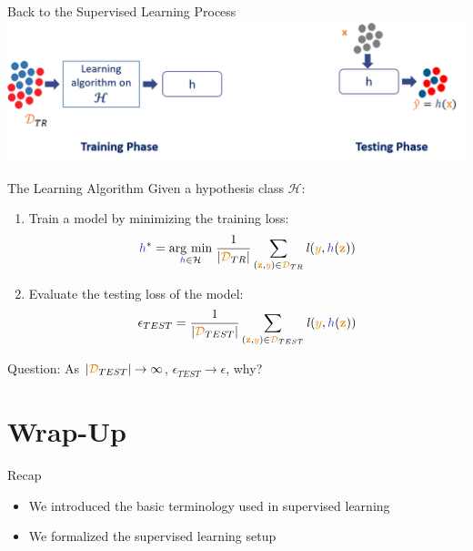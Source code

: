 \documentclass[aspectratio=169,10pt]{beamer}
\begin{document}
\begin{frame}{Back to the Supervised Learning Process}
	\centering
	\includegraphics[width=\textwidth, clip]{images/supervised_process}
\end{frame}

\begin{frame}{The Learning Algorithm}
	Given a hypothesis class $\mathcal{H}$:
	\begin{enumerate}
		\item Train a model by minimizing the training loss:
			\begin{equation*}
			\hypothesis^* = \argmin{\hypothesis \in \mathcal{H}} \dfrac{1}{|\trainset_{TR}|}\sum_{(\boldx,\smally) \in \trainset_{TR}} \mathit{l}(\smally, \hypothesis(\boldx))
		\end{equation*}
		\item Evaluate the testing loss of the model:
		\begin{equation*}
			\epsilon_{TEST} = \dfrac{1}{|\trainset_{TEST}|}\sum_{(\boldx,\smally) \in \trainset_{TEST}} \mathit{l}(\smally, \hypothesis(\boldx))
		\end{equation*}
	\end{enumerate}
	\alert{Question:} As $|\trainset_{TEST}| \rightarrow \infty$, $\epsilon_{TEST} \rightarrow \epsilon$, why?

\end{frame}
\section{Wrap-Up}
\begin{frame}{Recap}
	\begin{itemize}
		\item We introduced the basic terminology used in supervised learning
		\item We formalized the supervised learning setup 
	\end{itemize}
\end{frame}
\end{document}
